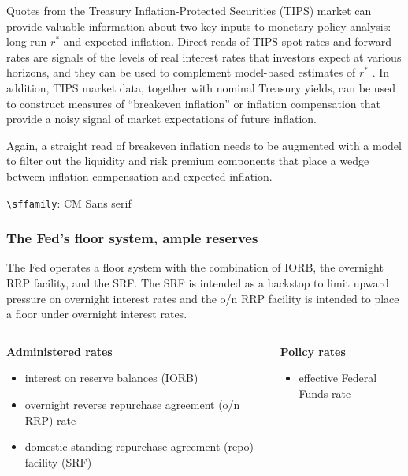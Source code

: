 \documentclass{beamer}
\begin{document}
\begin{frame}
Quotes from the Treasury Inflation-Protected Securities (TIPS) market can provide valuable information about two key inputs to monetary policy analysis: long-run $r^\ast$ and expected inflation. Direct reads of TIPS spot rates and forward rates are
signals of the levels of real interest rates that investors expect at various horizons, and they can be used to complement model-based estimates of $r^\ast$ . In addition, TIPS market data, together with nominal Treasury yields, can be used to construct measures
of “breakeven inflation” or inflation compensation that provide a noisy signal of market expectations of future inflation. 

Again, a straight read of breakeven inflation needs to be augmented with a model to filter out the liquidity and risk premium components that place a wedge between inflation compensation and expected inflation.
\end{frame}

\verb|\sffamily|: \sffamily CM Sans serif
\begin{frame}
\frametitle{The Fed's floor system, ample reserves}{\vspace*{-10mm}}
The Fed operates a floor system with the combination of IORB, the overnight RRP facility, and the SRF. The SRF is intended as a backstop to limit upward pressure on overnight interest rates and the o/n RRP facility is intended to place a floor under overnight interest rates. 
\bigskip
\begin{columns}[onlytextwidth,t]
  \begin{column}{0.48\textwidth}
    \bf{Administered rates} 
    \begin{itemize} 
        \item \normalfont interest on reserve balances (IORB) 
        \item overnight reverse repurchase agreement (o/n RRP) rate
        \item domestic standing repurchase agreement (repo) facility (SRF)
    \end{itemize}
   \end{column}
  \begin{column}{0.48\textwidth}
    \bf{Policy rates}
     \uncover<+>{}
     \begin{itemize}
        \item \normalfont effective Federal Funds rate
     \end{itemize}
  \end{column}
  \end{columns}
\end{frame}
\end{document}
